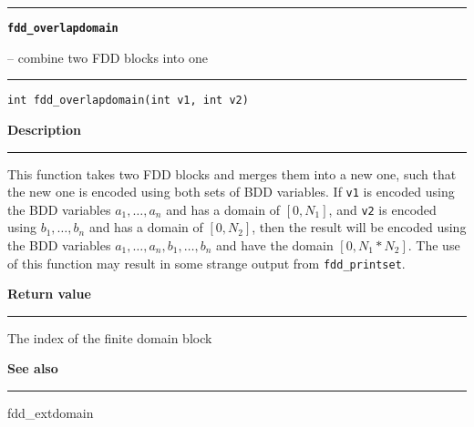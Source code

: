 \begin{minipage}{\textwidth}

\noindent\begin{minipage}{\textwidth}
\rule{\textwidth}{0.5mm}
{\tt\bf fdd\_overlapdomain }
\--- combine two FDD blocks into one  \hspace{\fill}
\\\rule[1.5ex]{\textwidth}{0.5mm}
\end{minipage}

\noindent\begin{verbatim}
int fdd_overlapdomain(int v1, int v2) 
\end{verbatim}

\vspace{\parsep}\noindent
{\bf Description}\\\rule[1.5ex]{\textwidth}{0.2mm}\vspace{-1.5ex}\setlength{\parindent}{1em}
This function takes two FDD blocks and merges them into a new one,
           such that the new one is encoded using both sets of BDD variables.
	   If {\tt v1} is encoded using the BDD variables $a_1, \ldots,
	   a_n$ and has a domain of $[0,N_1]$, and {\tt v2} is encoded using
	   $b_1, \ldots, b_n$ and has a domain of $[0,N_2]$, then the result
	   will be encoded using the BDD variables $a_1, \ldots, a_n, b_1,
	   \ldots, b_n$ and have the domain $[0,N_1*N_2]$. The use of this
	   function may result in some strange output from
	   {\tt fdd\_printset}. 

\setlength{\parindent}{0em}\vspace{\parsep}\vspace{\baselineskip}\noindent
{\bf Return value}\\\rule[1.5ex]{\textwidth}{0.2mm}\vspace{-1.5ex}
The index of the finite domain block 

\vspace{\parsep}\vspace{\baselineskip}\noindent
{\bf See also}\\\rule[1.5ex]{\textwidth}{0.2mm}\vspace{-1.5ex}
fdd\_extdomain 
\end{minipage}
\vspace{8ex}
